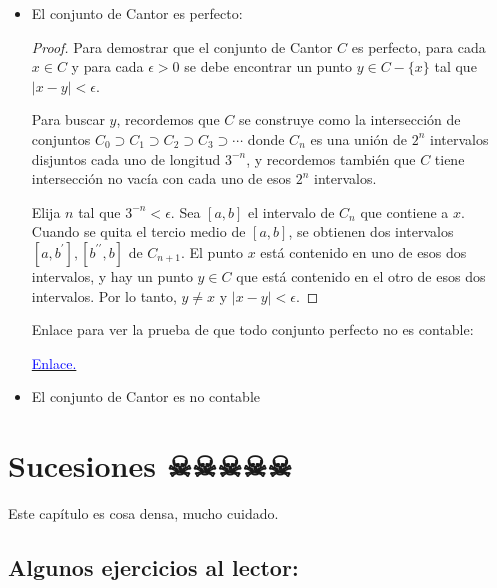 \begin{itemize}[label={✎},leftmargin=*]

\item El conjunto de Cantor es perfecto:\\


\begin{proof}
Para demostrar que el conjunto de Cantor $C$ es perfecto, para cada $x \in C$ y para cada $\epsilon>0$ se debe encontrar un punto $y \in C-\{x\}$ tal que $|x-y|<\epsilon$.

Para buscar $y$, recordemos que $C$ se construye como la intersección de conjuntos $C_0 \supset C_1 \supset C_2 \supset C_3 \supset \cdots$ donde $C_n$ es una unión de $2^n$ intervalos disjuntos cada uno de longitud $3^{-n}$, y recordemos también que $C$ tiene intersección no vacía con cada uno de esos $2^n$ intervalos.

Elija $n$ tal que $3^{-n}<\epsilon$.
Sea $[a, b]$ el intervalo de $C_n$ que contiene a $x$.
Cuando se quita el tercio medio de $[a, b]$, se obtienen dos intervalos $\left[a, b^{\prime}\right],\left[b^{\prime \prime}, b\right]$ de $C_{n+1}$. El punto $x$ está contenido en uno de esos dos intervalos, y hay un punto $y \in C$ que está contenido en el otro de esos dos intervalos. Por lo tanto, $y \neq x$ y $|x-y|<\epsilon$.
\end{proof}

\begin{note}
        Enlace para ver la prueba de que todo conjunto perfecto no es contable: 

        \href{https://math.stackexchange.com/questions/201922/proof-that-a-perfect-set-is-uncountable}{\textcolor{blue}{Enlace.}} 
\end{note}

\item El conjunto de Cantor es no contable
        
\end{itemize}

\section{Sucesiones ☠☠☠☠☠}

Este capítulo es cosa densa, mucho cuidado.

\subsection{Algunos ejercicios al lector:}

